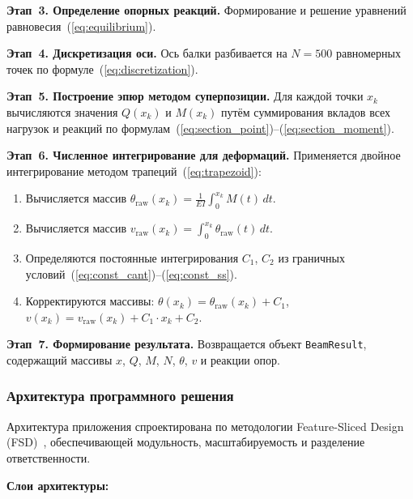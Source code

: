 \textbf{Этап~3. Определение опорных реакций.} Формирование и решение уравнений равновесия~(\ref{eq:equilibrium}).

\textbf{Этап~4. Дискретизация оси.} Ось балки разбивается на $N = 500$ равномерных точек по формуле~(\ref{eq:discretization}).

\textbf{Этап~5. Построение эпюр методом суперпозиции.} Для каждой точки $x_k$ вычисляются значения $Q(x_k)$ и $M(x_k)$ путём суммирования вкладов всех нагрузок и реакций по формулам~(\ref{eq:section_point})--(\ref{eq:section_moment}).

\textbf{Этап~6. Численное интегрирование для деформаций.} Применяется двойное интегрирование методом трапеций~(\ref{eq:trapezoid}):
\begin{enumerate}
  \item Вычисляется массив $\theta_{\text{raw}}(x_k) = \frac{1}{EI} \int_0^{x_k} M(t) \, dt$.
  \item Вычисляется массив $v_{\text{raw}}(x_k) = \int_0^{x_k} \theta_{\text{raw}}(t) \, dt$.
  \item Определяются постоянные интегрирования $C_1$, $C_2$ из граничных условий~(\ref{eq:const_cant})--(\ref{eq:const_ss}).
  \item Корректируются массивы: $\theta(x_k) = \theta_{\text{raw}}(x_k) + C_1$, $v(x_k) = v_{\text{raw}}(x_k) + C_1 \cdot x_k + C_2$.
\end{enumerate}


\textbf{Этап~7. Формирование результата.} Возвращается объект \texttt{BeamResult}, содержащий массивы $x$, $Q$, $M$, $N$, $\theta$, $v$ и реакции опор.


\subsubsection{Архитектура программного решения}

Архитектура приложения спроектирована по методологии Feature-Sliced Design (FSD)~\cite{martin_clean, gamma}, обеспечивающей модульность, масштабируемость и разделение ответственности.

\textbf{Слои архитектуры:}

